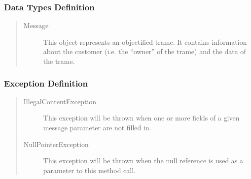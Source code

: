\subsubsection{Data Types Definition}

\begin{quote}
	\begin{description}
		\item[Message] This object represents an objectified trame. It contains
		information about the customer (i.e. the ``owner'' of the trame) and the data
		of the trame.
	\end{description} 
\end{quote}

\subsubsection{Exception Definition} 

\begin{quote}
	\begin{description}
		\item[IllegalContentException] This exception will be thrown when one or more
		fields of a given message parameter are not filled in. 
		\item[NullPointerException] This exception will be thrown when the null
		reference is used as a parameter to this method call.
	\end{description} 
\end{quote}